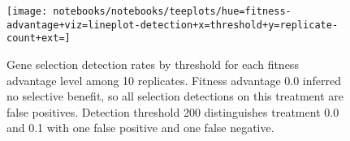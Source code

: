 \begin{figure}
  \centering
  \texttt{[image: notebooks/notebooks/teeplots/hue=fitness-advantage+viz=lineplot-detection+x=threshold+y=replicate-count+ext=]}
  \caption{
    Gene selection detection rates by threshold for each fitness advantage level among 10 replicates.
    Fitness advantage 0.0 inferred no selective benefit, so all selection detections on this treatment are false positives.
    Detection threshold 200 distinguishes treatment 0.0 and 0.1 with one false positive and one false negative.
  }
  \label{fig:selection-sensitivity-specificity}
\end{figure}
